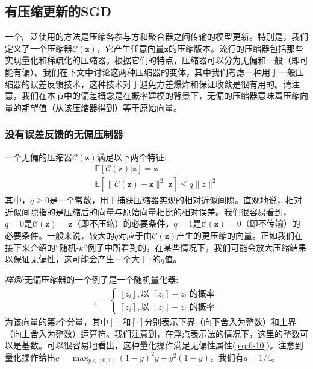 \subsection{有压缩更新的SGD}
一个广泛使用的方法是压缩各参与方和聚合器之间传输的模型更新\cite{alistarh2017qsgd, karimireddy2019error}。特别是，我们定义了一个压缩器$\mathcal{C}(\bm{z})$，它产生任意向量$\bm{z}$的压缩版本。流行的压缩器包括那些实现量化\cite{alistarh2017qsgd}和稀疏化\cite{stich2018sparsified}的压缩器。根据它们的特点，压缩器可以分为无偏和一般（即可能有偏）。我们在下文中讨论这两种压缩器的变体，其中我们考虑一种用于一般压缩器的误差反馈技术，这种技术对于避免方差爆炸和保证收敛是很有用的。请注意，我们在本节中的偏差概念是在概率建模的背景下，无偏的压缩器意味着压缩向量的期望值（从该压缩器得到）等于原始向量。

\subsubsection{没有误差反馈的无偏压制器}

一个无偏的压缩器$\mathcal{C}(\bm{z})$满足以下两个特征:
\begin{align}
	\mathbb{E}[\mathcal{C}(\bm{z}) | \bm{z}] = \bm{z} \label{eq:6-10} \\
	\mathbb{E}[\|\mathcal{C}(\bm{z}) - \bm{z}\|^{2} | \bm{z}] \le q\|z\|^{2} \label{eq:6-11}
\end{align}
其中，$q \ge 0$是一个常数，用于捕获压缩器实现的相对近似间隙。直观地说，相对近似间隙指的是压缩后的向量与原始向量相比的相对误差。我们很容易看到，$q=0$是$\mathcal{C}(\bm{z})=\bm{z}$（即不压缩）的必要条件，$q=1$是$\mathcal{C}(\bm{z})=0$（即不传输）的必要条件。一般来说，较大的$q$对应于由$\mathcal{C}(\bm{z})$产生的更压缩的向量。正如我们在接下来介绍的“随机-$k$”例子中所看到的，在某些情况下，我们可能会放大压缩结果以保证无偏性，这可能会产生一个大于$1$的$q$值。

\textit{样例:}无偏压缩器的一个例子是一个随机量化器:
\begin{align}
	[\mathcal{C}(\bm{z})]_{i} = \left\{ 
		\begin{matrix}
			\left \lfloor z_{i} \right \rfloor, \text{以 } \left \lceil z_{i} \right \rceil - z_{i} \text{ 的概率} \\
			\left \lceil z_{i} \right \rceil,  \text{以 } \left \lfloor z_{i} \right \rfloor - z_{i} \text{ 的概率}
		\end{matrix}
	\right. \label{eq:6-12}
\end{align}
为该向量的第$i$个分量，其中$\left \lfloor \cdot \right \rfloor$和$\left \lceil \cdot \right \rceil$分别表示下界（向下舍入为整数）和上界（向上舍入为整数）运算符。我们注意到，在浮点表示法的情况下，这里的整数可以是基数。可以很容易地看出，这种量化操作满足无偏性属性(\ref{eq:6-10})。注意到量化操作给出$q = \max_{y\in [0,1]} (1-y)^{2}y + y^{2}(1-y)$，我们有$q = 1/4$。

